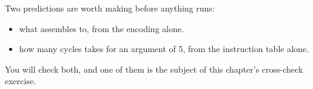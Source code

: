 Two predictions are worth making before anything runs:
\begin{itemize}
  \item what  assembles to, from the encoding alone.
  \item how many cycles  takes for an argument of 5, from the instruction table
    alone.
\end{itemize}
You will check both, and one of them is the subject of this chapter's cross-check exercise.







